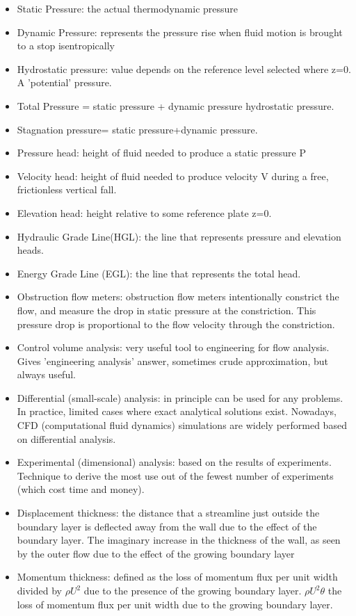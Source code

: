 \begin{itemize}
    \item Static Pressure: the actual thermodynamic pressure
    \item Dynamic Pressure: represents the pressure rise when fluid motion is brought to a stop isentropically
    \item Hydrostatic pressure: value depends on the reference level selected where z=0. A 'potential' pressure.
    \item Total Pressure = static pressure + dynamic pressure hydrostatic pressure.
    \item Stagnation pressure= static pressure+dynamic pressure.
    \item Pressure head: height of fluid needed to produce a static pressure P
    \item Velocity head: height of fluid needed to produce velocity V during a free, frictionless vertical fall.
    \item Elevation head: height relative to some reference plate z=0.
    \item Hydraulic Grade Line(HGL): the line that represents pressure and elevation heads.
    \item Energy Grade Line (EGL): the line that represents the total head.
    \item Obstruction flow meters: obstruction flow meters intentionally constrict the flow, and measure the drop in static pressure at the constriction. This pressure drop is proportional to the flow velocity through the constriction.
    \item Control volume analysis: very useful tool to engineering for flow analysis. Gives 'engineering analysis' answer, sometimes crude approximation, but always useful.
    \item Differential (small-scale) analysis: in principle can be used for any problems. In practice, limited cases where exact analytical solutions exist. Nowadays, CFD (computational fluid dynamics) simulations are widely performed based on differential analysis.
    \item Experimental (dimensional) analysis: based on the results of experiments. Technique to derive the most use out of the fewest number of experiments (which cost time and money).
    \item Displacement thickness: the distance that a streamline just outside the boundary layer is deflected away from the wall due to the effect of the boundary layer. The imaginary increase in the thickness of the wall, as seen by the outer flow due to the effect of the growing boundary layer
    \item Momentum thickness: defined as the loss of momentum flux per unit width divided by $\rho U^2$ due to the presence of the growing boundary layer. $\rho U^2 \theta$ the loss of momentum flux per unit width due to the growing boundary layer.
\end{itemize}
